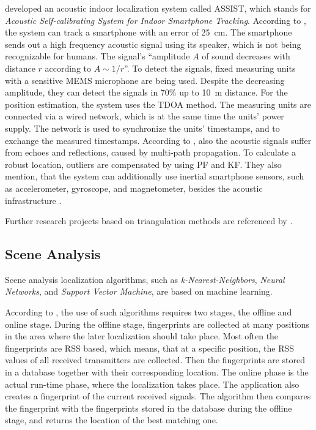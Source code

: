 \citet{hoflinger:acoustic} developed an acoustic indoor localization system called ASSIST, which stands for \emph{Acoustic Self-calibrating System for Indoor Smartphone Tracking}. According to \citet{hoflinger:acoustic}, the system can track a smartphone with an error of 25~cm. The smartphone sends out a high frequency acoustic signal using its speaker, which is not being recognizable for humans. The signal's ``amplitude $A$ of sound decreases with distance $r$ according to $A \sim 1/r$''. To detect the signals, fixed measuring units with a sensitive \ac{MEMS} microphone are being used. Despite the decreasing amplitude, they can detect the signals in 70\% up to 10~m distance. For the position estimation, the system uses the \acs{TDOA} method. The measuring units are connected via a wired network, which is at the same time the units' power supply. The network is used to synchronize the units' timestamps, and to exchange the measured timestamps. According to \citet{hoflinger:acoustic}, also the acoustic signals suffer from echoes and reflections, caused by multi-path propagation. To calculate a robust location, outliers are compensated by using \acs{PF} and \acs{KF}. They also mention, that the system can additionally use inertial smartphone sensors, such as accelerometer, gyroscope, and magnetometer, besides the acoustic infrastructure \citep{hoflinger:acoustic, hoflinger:assist}.

Further research projects based on triangulation methods are referenced by \citet{IEEE:survey_wireless_indoor_pos}.

\subsection{Scene Analysis}
Scene analysis localization algorithms, such as \emph{k-Nearest-Neighbors}, \emph{Neural Networks}, and \emph{Support Vector Machine}, are based on machine learning.

According to \citet{IEEE:survey_wireless_indoor_pos}, the use of such algorithms requires two stages, the offline and online stage. During the offline stage, fingerprints are collected at many positions in the area where the later localization should take place. Most often the fingerprints are \acs{RSS} based, which means, that at a specific position, the \acs{RSS} values of all received transmitters are collected. Then the fingerprints are stored in a database together with their corresponding location. The online phase is the actual run-time phase, where the localization takes place. The application also creates a fingerprint of the current received signals. The algorithm then compares the fingerprint with the fingerprints stored in the database during the offline stage, and returns the location of the best matching one.


